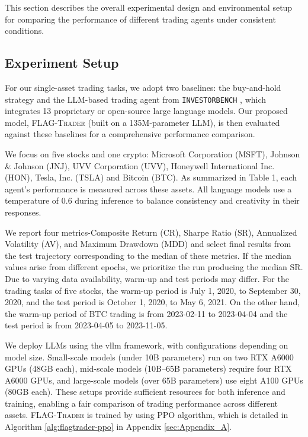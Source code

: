 This section describes the overall experimental design and environmental setup for comparing the performance of different trading agents under consistent conditions.

\subsection{Experiment Setup}
For our single-asset trading tasks, we adopt two baselines: the buy-and-hold strategy and the LLM-based trading agent from \texttt{INVESTORBENCH} \cite{li2024investorbench}, which integrates 13 proprietary or open-source large language models. Our proposed model, \textsc{FLAG-Trader} (built on a 135M-parameter LLM), is then evaluated against these baselines for a comprehensive performance comparison.

We focus on five stocks and one crypto: Microsoft Corporation (MSFT), Johnson \& Johnson (JNJ), UVV Corporation (UVV), Honeywell International Inc. (HON), Tesla, Inc. (TSLA) and Bitcoin (BTC). As summarized in Table 1, each agent’s performance is measured across these assets. All language models use a temperature of 0.6 during inference to balance consistency and creativity in their responses.

We report four metrics-Composite Return (CR), Sharpe Ratio (SR), Annualized Volatility (AV), and Maximum Drawdown (MDD) and select final results from the test trajectory corresponding to the median of these metrics. If the median values arise from different epochs, we prioritize the run producing the median SR. Due to varying data availability, warm-up and test periods may differ. For the trading tasks of five stocks, the warm-up period is July 1, 2020, to September 30, 2020, and the test period is October 1, 2020, to May 6, 2021. On the other hand, the warm-up period of BTC trading is from 2023-02-11 to 2023-04-04 and the test period is from 2023-04-05 to 2023-11-05.

We deploy LLMs using the vllm framework, with configurations depending on model size. Small-scale models (under 10B parameters) run on two RTX A6000 GPUs (48GB each), mid-scale models (10B–65B parameters) require four RTX A6000 GPUs, and large-scale models (over 65B parameters) use eight A100 GPUs (80GB each). These setups provide sufficient resources for both inference and training, enabling a fair comparison of trading performance across different assets.
\textsc{FLAG-Trader} is trained by using PPO algorithm, which is detailed in Algorithm \ref{alg:flagtrader-ppo} in Appendix \ref{sec:Appendix_A}.  



